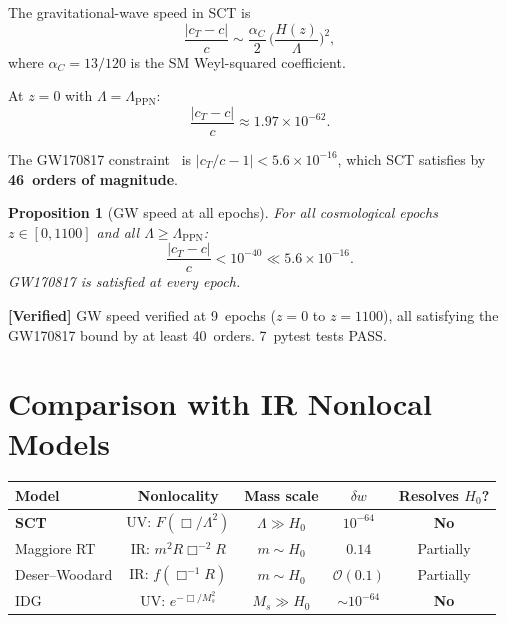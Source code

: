 \documentclass[11pt,a4paper]{article}
\newcommand{\Lam}{\Lambda}
\theoremstyle{plain}
\newtheorem{proposition}[theorem]{Proposition}
\theoremstyle{definition}
\newcommand{\verified}[1]{%
  \par\smallskip\noindent
  \colorbox{green!10}{\parbox{\dimexpr\linewidth-2\fboxsep}{%
    \textcolor{green!50!black}{\textbf{[Verified]}} #1}}%
  \par\smallskip}
\begin{document}
The gravitational-wave speed in SCT is
\begin{equation}\label{eq:cT}
  \frac{|c_T - c|}{c}
  \sim \frac{\alpha_C}{2}\,\biggl(\frac{H(z)}{\Lam}\biggr)^{\!2},
\end{equation}
where $\alpha_C = 13/120$ is the SM Weyl-squared coefficient.

At $z = 0$ with $\Lam = \Lam_{\mathrm{PPN}}$:
\begin{equation}\label{eq:cT-value}
  \boxed{
  \frac{|c_T - c|}{c}
  \approx 1.97 \times 10^{-62}.
  }
\end{equation}

The GW170817 constraint~\cite{GW170817} is
$|c_T/c - 1| < 5.6 \times 10^{-16}$, which SCT satisfies by
\textbf{46~orders of magnitude}.

\begin{proposition}[GW speed at all epochs]
For all cosmological epochs $z \in [0, 1100]$ and all
$\Lam \geq \Lam_{\mathrm{PPN}}$:
\begin{equation}
  \frac{|c_T - c|}{c} < 10^{-40} \ll 5.6 \times 10^{-16}.
\end{equation}
GW170817 is satisfied at every epoch.
\end{proposition}

\verified{GW speed verified at 9~epochs ($z = 0$ to $z = 1100$),
all satisfying the GW170817 bound by at least 40~orders. 7~pytest
tests PASS.}

\section{Comparison with IR Nonlocal Models}\label{sec:comparison}

\begin{center}
\begin{tabular}{lcccc}
\toprule
Model & Nonlocality & Mass scale & $\delta w$ & Resolves $H_0$? \\
\midrule
\textbf{SCT} & UV: $F(\Box/\Lam^2)$ & $\Lam \gg H_0$
  & $10^{-64}$ & \textbf{No} \\
Maggiore RT & IR: $m^2 R\Box^{-2}R$ & $m \sim H_0$
  & $0.14$ & Partially \\
Deser--Woodard & IR: $f(\Box^{-1}R)$ & $m \sim H_0$
  & $\mathcal{O}(0.1)$ & Partially \\
IDG & UV: $e^{-\Box/M_s^2}$ & $M_s \gg H_0$
  & $\sim 10^{-64}$ & \textbf{No} \\
\bottomrule
\end{tabular}
\end{center}
\end{document}

